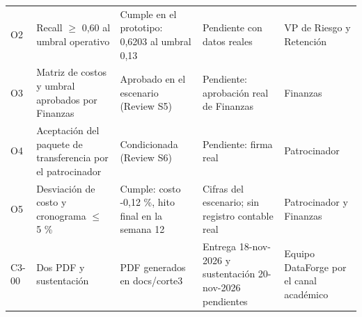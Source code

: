 \begin{tabularx}{\linewidth}{l X p{2.6cm} p{3.1cm} p{2.6cm}}
O2 & Recall $\geq$ 0,60 al umbral operativo & Cumple en el prototipo: 0,6203 al umbral 0,13 & Pendiente con datos reales & VP de Riesgo y Retención \\
O3 & Matriz de costos y umbral aprobados por Finanzas & Aprobado en el escenario (Review S5) & Pendiente: aprobación real de Finanzas & Finanzas \\
O4 & Aceptación del paquete de transferencia por el patrocinador & Condicionada (Review S6) & Pendiente: firma real & Patrocinador \\
O5 & Desviación de costo y cronograma $\leq$ 5 \% & Cumple: costo -0,12 \%, hito final en la semana 12 & Cifras del escenario; sin registro contable real & Patrocinador y Finanzas \\
C3-00 & Dos PDF y sustentación & PDF generados en docs/corte3 & Entrega 18-nov-2026 y sustentación 20-nov-2026 pendientes & Equipo DataForge por el canal académico \\
\bottomrule
\end{tabularx}
